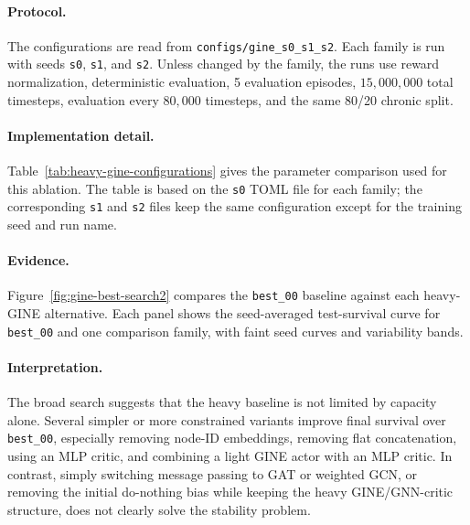 \paragraph{Protocol.}
The configurations are read from
\texttt{configs/gine\_s0\_s1\_s2}. Each family is run with seeds
\texttt{s0}, \texttt{s1}, and \texttt{s2}. Unless changed by the family, the
runs use reward normalization, deterministic evaluation, 5 evaluation episodes,
\(15{,}000{,}000\) total timesteps, evaluation every \(80{,}000\) timesteps, and
the same 80/20 chronic split.

\paragraph{Implementation detail.}
Table~\ref{tab:heavy-gine-configurations} gives the parameter comparison used
for this ablation. The table is based on the \texttt{s0} TOML file for each
family; the corresponding \texttt{s1} and \texttt{s2} files keep the same
configuration except for the training seed and run name.

\paragraph{Evidence.}
Figure~\ref{fig:gine-best-search2} compares the \texttt{best\_00} baseline
against each heavy-GINE alternative. Each panel shows the seed-averaged
test-survival curve for \texttt{best\_00} and one comparison family, with faint
seed curves and variability bands.

\paragraph{Interpretation.}
The broad search suggests that the heavy baseline is not limited by capacity
alone. Several simpler or more constrained variants improve final survival over
\texttt{best\_00}, especially removing node-ID embeddings, removing flat
concatenation, using an MLP critic, and combining a light GINE actor with an MLP
critic. In contrast, simply switching message passing to GAT or weighted GCN,
or removing the initial do-nothing bias while keeping the heavy GINE/GNN-critic
structure, does not clearly solve the stability problem.


